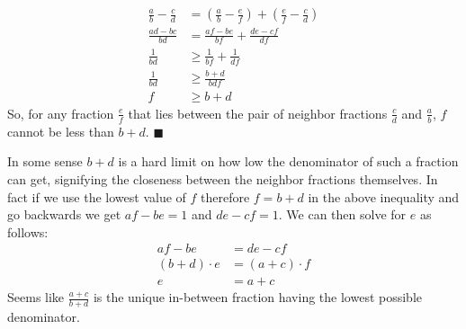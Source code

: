 \documentclass{article}
\begin{document}
\begin{displaymath}
\begin{split}
	\frac{a}{b}-\frac{c}{d} &= \left( \frac{a}{b}-\frac{e}{f} \right) + \left( \frac{e}{f}-\frac{c}{d} \right)\\
	\frac{ad-bc}{bd}&= \frac{af-be}{bf}+\frac{de-cf}{df}\\
	\frac{1}{bd} &\geq \frac{1}{bf}+\frac{1}{df}\\
	\frac{1}{bd} &\geq \frac{b+d}{bdf}\\
	f &\geq b+d
\end{split}
\end{displaymath}
So, for any fraction $\frac{e}{f}$ that lies between the pair of neighbor fractions $\frac{c}{d}$ and $\frac{a}{b}$, $f$ cannot be less than $b+d$.  $\blacksquare$

In some sense $b+d$ is a hard limit on how low the denominator of such a fraction can get, signifying the closeness between the neighbor fractions themselves. In fact if we use the lowest value of $f$ therefore $f=b+d$ in the above inequality and go backwards we get $af-be = 1$ and $de-cf = 1$. We can then solve for $e$ as follows:
\begin{displaymath}
\begin{split}
	af-be &= de-cf\\
   (b+d)\cdot e &= (a+c)\cdot f\\
       e  &= a+c
\end{split}
\end{displaymath}
Seems like $\frac{a+c}{b+d}$ is the unique in-between fraction having the lowest possible denominator.
\end{document}
